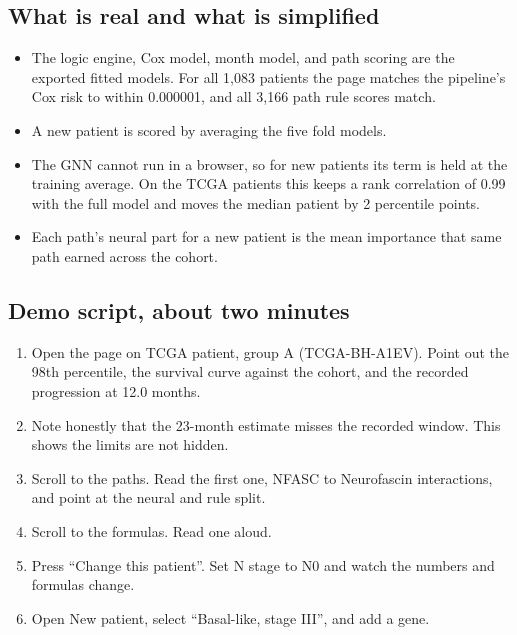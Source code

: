 \documentclass[11pt,a4paper]{article}
\begin{document}
\subsection{What is real and what is simplified}
\begin{itemize}
  \item The logic engine, Cox model, month model, and path scoring are the exported fitted models. For all 1,083 patients the page matches the pipeline's Cox risk to within 0.000001, and all 3,166 path rule scores match.
  \item A new patient is scored by averaging the five fold models.
  \item The GNN cannot run in a browser, so for new patients its term is held at the training average. On the TCGA patients this keeps a rank correlation of 0.99 with the full model and moves the median patient by 2 percentile points.
  \item Each path's neural part for a new patient is the mean importance that same path earned across the cohort.
\end{itemize}

\subsection{Demo script, about two minutes}
\begin{enumerate}
  \item Open the page on TCGA patient, group A (TCGA-BH-A1EV). Point out the 98th percentile, the survival curve against the cohort, and the recorded progression at 12.0 months.
  \item Note honestly that the 23-month estimate misses the recorded window. This shows the limits are not hidden.
  \item Scroll to the paths. Read the first one, NFASC to Neurofascin interactions, and point at the neural and rule split.
  \item Scroll to the formulas. Read one aloud.
  \item Press ``Change this patient''. Set N stage to N0 and watch the numbers and formulas change.
  \item Open New patient, select ``Basal-like, stage III'', and add a gene.
\end{enumerate}

\end{document}
